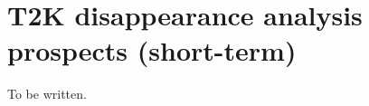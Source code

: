 \section {T2K disappearance analysis prospects (short-term)}
\label{sec:prospects}

To be written.

